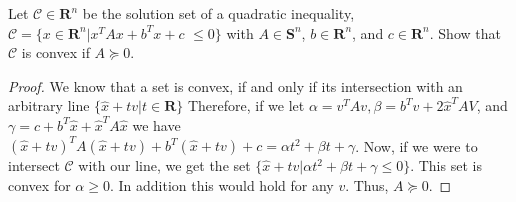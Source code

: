 \begin{prob}[1.6]
  Let $\mathcal{C} \in \mathbf{R}^{n}$ be the solution set of a quadratic
  inequality, $\mathcal{C} = \{ x \in \mathbf{R}^{n} \vert x^{T}Ax + b^{T}x + c$
  $\leq 0\}$ with $A \in \mathbf{S}^{n}$, $b \in \mathbf{R}^{n}$, and
  $c \in \mathbf{R}^{n}$. Show that $\mathcal{C}$ is convex if
  $A \succeq 0$.
\end{prob}
\begin{proof}
  We know that a set is convex, if and only if  its 
  intersection with an arbitrary line $\{\hat{x} + tv \vert t \in \mathbf{R}\}$
  Therefore, if we let $\alpha = v^{T}Av, \beta = b^{T}v + 2\hat{x}^{T}AV$, and
  $\gamma = c + b^{T}\hat{x} + \hat{x}^{T}A\hat{x}$ we have
  $(\hat{x} + tv)^{T}A(\hat{x} + tv) + b^{T}(\hat{x} + tv) + c = \alpha t^{2} + \beta t + \gamma$.
  Now, if we were to intersect $\mathcal{C}$ with our line, we get the set
  $\{\hat{x} + tv \vert \alpha t^{2} + \beta t + \gamma \leq 0\}$. This set is
  convex for $\alpha \geq 0$.  In addition this would hold for any $v$. Thus,
  $A \succeq 0$. 
\end{proof}
